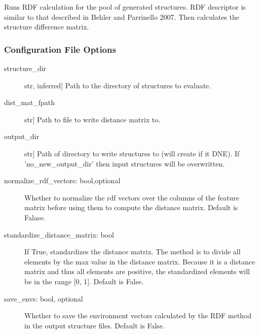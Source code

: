 \documentclass[letterpaper,10pt,english]{sphinxmanual}
\begin{document}
\begin{fulllineitems}
\begin{fulllineitems}
\begin{description}
\end{description}

\end{fulllineitems}


\begin{fulllineitems}
\label{\detokenize{index:Genarris.genarris_master.Genarris.Run_Rdf_Calc}}
Runs RDF calculation for the pool of generated structures. RDF
descriptor is similar to that described in Behler and Parrinello 2007.
Then calculates the structure difference matrix.
\subsubsection*{Configuration File Options}
\begin{description}
\item[{structure\_dir}] \leavevmode{[}str, inferred{]}
Path to the directory of structures to evaluate.

\item[{dist\_mat\_fpath}] \leavevmode{[}str{]}
Path to file to write distance matrix to.

\item[{output\_dir}] \leavevmode{[}str{]}
Path of directory to write structures to (will create if it DNE).
If 'no\_new\_output\_dir' then input structures will be overwritten.

\item[{normalize\_rdf\_vectors: bool,optional}] \leavevmode
Whether to normalize the rdf vectors over the columns of the
feature matrix before using them to compute the distance matrix.
Default is Falase.

\item[{standardize\_distance\_matrix: bool}] \leavevmode
If True, standardizes the distance matrix. The method is to divide
all elements by the max value in the distance matrix.
Because it is a distance matrix and thus all elements are positive,
the standardized elements will be in the range {[}0, 1{]}.
Default is False.

\item[{save\_envs: bool, optional}] \leavevmode
Whether to save the environment vectors calculated by the RDF
method in the output structure files. Default is False.


\end{description}
\end{fulllineitems}
\end{fulllineitems}
\end{document}
